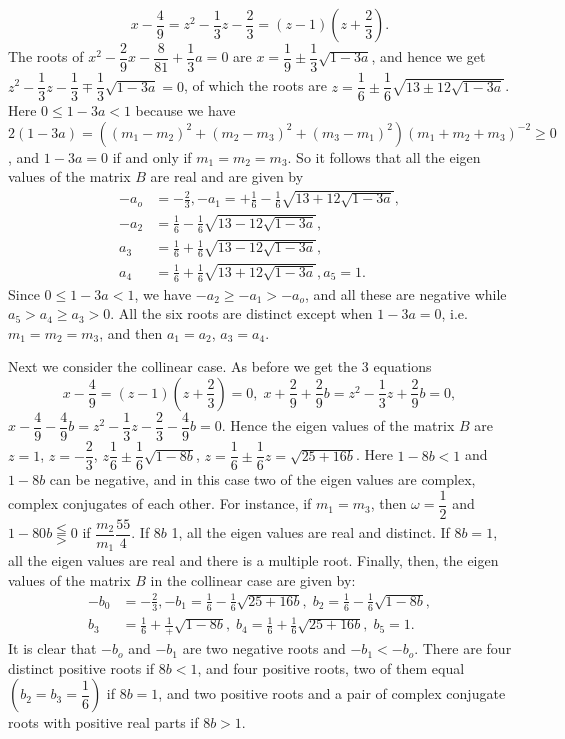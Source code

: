$$
x - \frac{4}{9} = z^2  - \frac{1}{3} z - \frac{2}{3} = (z-1)
(z+\frac{2}{3}).  
$$
The roots of $x^2 - \dfrac{2}{9} x - \dfrac{8}{81} + \dfrac{1}{3} a =
0$ are $x =\dfrac{1}{9} \pm \dfrac{1}{3} \sqrt{1-3a}$, and hence we
get $z^2 - \dfrac{1}{3} z - \dfrac{1}{3} \mp \dfrac{1}{3} \sqrt{1-3a}
= 0$, of which the roots are $z =\dfrac{1}{6} \pm \dfrac{1}{6}
\sqrt{13 \pm 12\sqrt{1-3a}}$. Here $0 \leq 1-3a <1$ because we have
$2(1-3a) = ((m_1 - m_2)^2 + (m_2 - m_3)^2 + (m_3 -m_1)^2) (m_1 + m_2 +
m_3)^{-2} \geq 0$, and $1-3a = 0$ if and only if $m_1 = m_2 = m_3$. So
it follows that all the eigen values of the matrix $B$ are real and
are given by 
\begin{align*}
-a_o & = - \frac{2}{3}, -a_1 = + \frac{1}{6} - \frac{1}{6}
\sqrt{13+12\sqrt{1-3a}},\\ 
-a_2 &= \frac{1}{6} - \frac{1}{6} \sqrt{13-12 \sqrt{1-3a}}, \\
a_3 & = \frac{1}{6} + \frac{1}{6} \sqrt{13-12 \sqrt{1-3a}}, \\
a_4 &= \frac{1}{6} + \frac{1}{6} \sqrt{13+12 \sqrt{1-3a}}, a_5
=1. \tag{3.4.53}\label{chap3:eq3.4.53} 
\end{align*}
Since $0 \leq 1-3a <1$, we have $-a_2\geq -a_1 > - a_o$, and all these
are negative while $a_5 > a_4 \geq a_3 > 0$. All the six roots are
distinct except when $1-3a =0$, i.e. $m_1 = m_2 = m_3$, and then $a_1
=a_2$, $a_3 = a_4$. 

Next we consider the collinear case. As before we get the 3 equations 
$$
x - \frac{4}{9} = (z-1) (z+\frac{2}{3}) = 0, \; x + \frac{2}{9} +
\frac{2}{9} b = z^2 - \frac{1}{3} z + \frac{2}{9} b = 0, 
$$\pageoriginale
$x - \dfrac{4}{9} - \dfrac{4}{9} b = z^2 - \dfrac{1}{3} z
-\dfrac{2}{3} - \dfrac{4}{9} b = 0$. Hence the eigen values of the
matrix $B$ are $z = 1$, $z = -\dfrac{2}{3}$, $z \dfrac{1}{6} \pm
\dfrac{1}{6} \sqrt{1-8b}$, $z = \dfrac{1}{6} \pm \dfrac{1}{6} z =
\sqrt{25 + 16b}$. Here $1 - 8b < 1$ and $1-8b$ can be negative, and in
this case two of the eigen values are complex, complex conjugates of
each other. For instance, if $m_1 = m_3$, then $\omega = \dfrac{1}{2}$
and $1 - 80b \lesseqqgtr 0$ if $\dfrac{m_2}{m_1} \dfrac{55}{4}$. If
$8b$ 1, all the eigen values are real and distinct. If $8b =1$, all
the eigen values are real and there is a multiple root. Finally, then,
the eigen values of the matrix $B$ in the collinear case are given by: 
\begin{align*}
-b_0 & = -\frac{2}{3}, - b_1 = \frac{1}{6} -\frac{1}{6} \sqrt{25 +16
  b}, \; b_2 = \frac{1}{6} -\frac{1}{6} \sqrt{1-8b},\\ 
b_3 & = \frac{1}{6} + \frac{1}{+} \sqrt{1-8b}, \; b_4 = \frac{1}{6} +
\frac{1}{6} \sqrt{25+16b} , \; b_5
=1. \tag{3.4.54}\label{chap3:eq3.4.54} 
\end{align*}
It is clear that $-b_o$ and $-b_1$ are two negative roots and $-b_1 <
-b_o$. There are four distinct positive roots if $8b <1$, and four
positive roots, two of them equal $(b_2 = b_3 =\dfrac{1}{6})$ if $8b
=1$, and two positive roots and a pair of complex conjugate roots with
positive real parts if $8b > 1$. 

